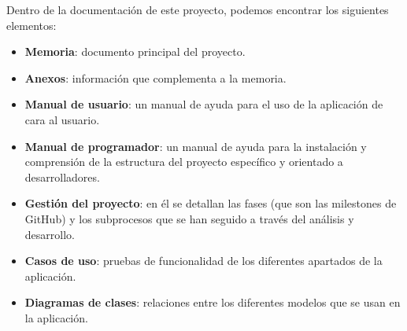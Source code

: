 Dentro de la documentación de este proyecto, podemos encontrar los siguientes elementos:
\begin{itemize}
 \item \textbf{Memoria}: documento principal del proyecto.
 \item \textbf{Anexos}: información que complementa a la memoria. 
 \item \textbf{Manual de usuario}: un manual de ayuda para el uso de la aplicación de cara al usuario. 
 \item \textbf{Manual de programador}: un manual de ayuda para la instalación y comprensión de la estructura del proyecto específico y orientado a desarrolladores.
 \item \textbf{Gestión del proyecto}: en él se detallan las fases (que son las milestones de GitHub) y los subprocesos que se han seguido a través del análisis y desarrollo.
 \item \textbf{Casos de uso}: pruebas de funcionalidad de los diferentes apartados de la aplicación.
 \item \textbf{Diagramas de clases}: relaciones entre los diferentes modelos que se usan en la aplicación.
\end{itemize}


